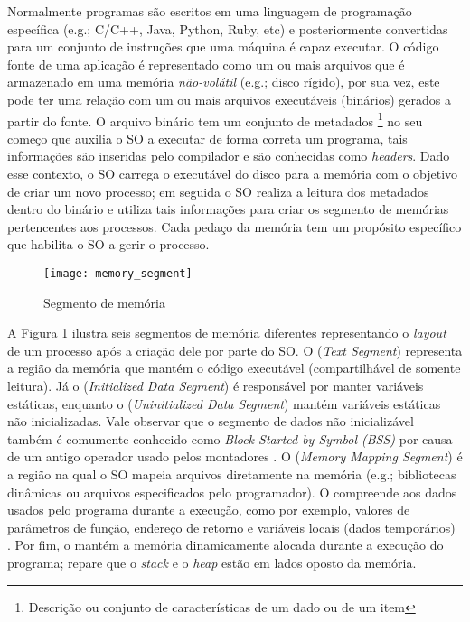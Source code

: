 Normalmente programas são escritos em uma linguagem de programação específica
(e.g.; C/C++, Java, Python, Ruby, etc) e posteriormente convertidas para um
conjunto de instruções que uma máquina é capaz executar. O código fonte de uma
aplicação é representado como um ou mais arquivos que é armazenado em uma
memória \emph{não-volátil} (e.g.; disco rígido), por sua vez, este pode ter uma
relação com um ou mais arquivos executáveis (binários) gerados a partir do
fonte. O arquivo binário tem um conjunto de metadados \footnote{Descrição ou
conjunto de características de um dado ou de um item} no seu começo que auxilia
o SO a executar de forma correta um programa, tais informações são inseridas
pelo compilador e são conhecidas como \emph{headers}. Dado esse contexto, o SO
carrega o executável do disco para a memória com o objetivo de criar um novo
processo; em seguida o SO realiza a leitura dos metadados dentro do binário e
utiliza tais informações para criar os segmento de memórias pertencentes aos
processos. Cada pedaço da memória tem um propósito específico que habilita
o SO a gerir o processo.

\begin{figure}[!h]
  \centering
  \texttt{[image: memory\_segment]} 
  \caption{Segmento de memória}
  \label{fig:memory_segment} 
\end{figure}

A Figura \ref{fig:memory_segment} ilustra seis segmentos de memória diferentes
representando o \emph{layout} de um processo após a criação dele por parte do
SO. O  (\emph{Text Segment}) representa a região da
memória que mantém o código executável (compartilhável de somente
leitura). Já o  (\emph{Initialized
Data Segment}) é responsável por manter variáveis estáticas, enquanto o
 (\emph{Uninitialized Data
Segment}) mantém variáveis estáticas não inicializadas.  Vale observar que o
segmento de dados não inicializável também é comumente conhecido como
\emph{Block Started by Symbol (BSS)} por causa de um antigo operador usado
pelos montadores \citep{gdb}. O 
(\emph{Memory Mapping Segment}) é a região na qual o SO mapeia arquivos
diretamente na memória (e.g.; bibliotecas dinâmicas ou arquivos especificados
pelo programador). O  compreende aos dados usados
pelo programa durante a execução, como por exemplo, valores de parâmetros de
função, endereço de retorno e variáveis locais (dados temporários)
\citep{silberschatz}.  Por fim, o  mantém a memória
dinamicamente alocada durante a execução do programa; repare que o \emph{stack}
e o \emph{heap} estão em lados oposto da memória.

